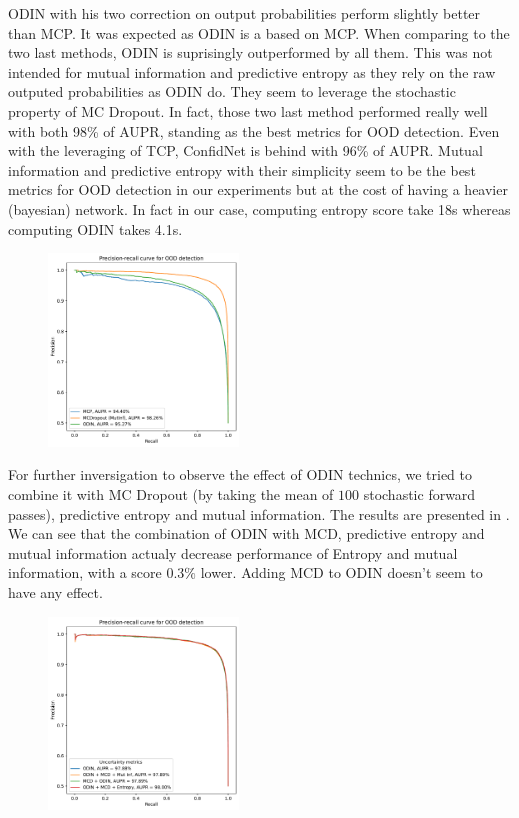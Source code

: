 ODIN with his two correction on output probabilities perform slightly better than MCP. It was expected as ODIN is a based on MCP. When comparing to the two last methods, ODIN is suprisingly outperformed by all them. This was not intended for mutual information and predictive entropy as they rely on the raw outputed probabilities as ODIN do. They seem to leverage the stochastic property of MC Dropout. In fact, those two last method performed really well with both 98\% of AUPR, standing as the best metrics for OOD detection. 
Even with the leveraging of TCP, ConfidNet is behind with 96\% of AUPR. Mutual information and predictive entropy with their simplicity seem to be the best metrics for OOD detection in our experiments but at the cost of having a heavier (bayesian) network. In fact in our case, computing entropy score take 18s whereas computing ODIN takes 4.1s.
\begin{figure}[H]
    \centering
    \includegraphics[width=0.45\textwidth]{OOD_aupr.pdf}
    \caption{}
    \label{fig:OOD_aupr}
\end{figure}

For further inversigation to observe the effect of ODIN technics, we tried to combine it with MC Dropout (by taking the mean of $ 100 $ stochastic forward passes), predictive entropy and mutual information. The results are presented in . We can see that the combination of ODIN with MCD, predictive entropy and mutual information actualy decrease performance of Entropy and mutual information, with a score $ 0.3\% $ lower. Adding MCD to ODIN doesn't seem to have any effect. 
\begin{figure}[H]
    \centering
    \includegraphics[width=0.45\textwidth]{OOD_aupr_combo.pdf}
    \caption{}
    \label{fig:OOD_aupr_combo}
\end{figure}

